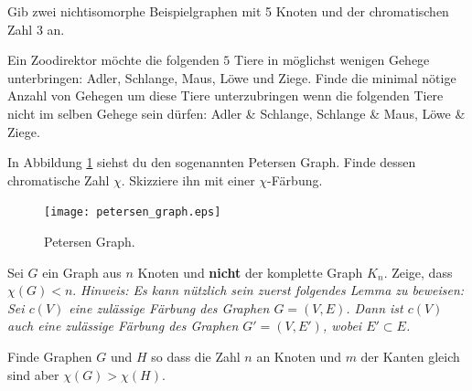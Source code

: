 \subexercise[%
  topic=Chromatische Zahl,
    ]
Gib zwei nichtisomorphe Beispielgraphen mit 5 Knoten und der chromatischen Zahl 3 an.

\subexercise[%
  topic=Zoodirektor,
    ]
    Ein Zoodirektor m\"ochte die folgenden $5$ Tiere in m\"oglichst wenigen Gehege unterbringen: Adler, Schlange, Maus, L\"owe und Ziege. Finde die minimal n\"otige Anzahl von Gehegen um diese Tiere unterzubringen wenn die folgenden Tiere nicht im selben Gehege sein d\"urfen: Adler \& Schlange, Schlange \& Maus, L\"owe \& Ziege.


\subexercise[%
  topic=Petersen Graph,
    ]
    In Abbildung \ref{petersen} siehst du den sogenannten Petersen Graph. Finde dessen chromatische Zahl $\chi$. Skizziere ihn mit einer $\chi$-F\"arbung.

\begin{figure}[h]
    \centering
    \texttt{[image: petersen\_graph.eps]}
    \caption{\label{petersen} Petersen Graph.}

\end{figure}

\subexercise[%
  topic=Eine Obergrenze f\"ur die chromatische Zahl,
    ]
Sei $G$ ein Graph aus $n$ Knoten und {\bf nicht} der komplette Graph $K_n$. Zeige, dass $\chi (G) < n$.
\emph{Hinweis: Es kann n\"utzlich sein zuerst folgendes Lemma zu beweisen: Sei $c(V)$ eine zul\"assige F\"arbung des Graphen $G=(V,E)$. Dann ist $c(V)$ auch eine zul\"assige F\"arbung des Graphen $G'=(V,E')$, wobei $E'\subset E$.}


\subexercise[%
  topic=Graphen gleicher Gr\"o\ss e mit unterschiedlichem Chromatischer Zahl,
    ]
		
		Finde Graphen $G$ und $H$ so dass die Zahl $n$ an Knoten und $m$ der Kanten gleich sind aber $\chi (G)> \chi (H)$.


\exercise[%
  topic = Graphisomorphismus 
    ]
		
		\subexercise[%
  topic=Isomorphie von Graphen untersuchen,
    ]
		
